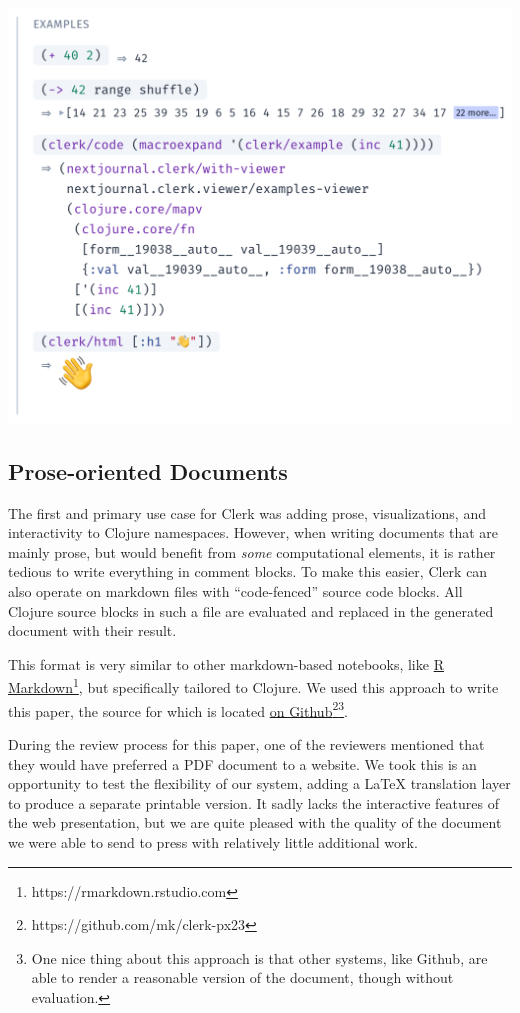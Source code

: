 \documentclass[sigconf,screen]{acmart}
\begin{document}
\includegraphics{images/anon-expr-5dtPQwixfSw57U4Tdiwqwrsj2tVHu1-result.png}

\hypertarget{prose-oriented-documents}{%
\subsection{Prose-oriented Documents}\label{prose-oriented-documents}}

The first and primary use case for Clerk was adding prose, visualizations, and interactivity to Clojure namespaces. However, when writing documents that are mainly prose, but would benefit from \emph{some} computational elements, it is rather tedious to write everything in comment blocks. To make this easier, Clerk can also operate on markdown files with ``code-fenced'' source code blocks. All Clojure source blocks in such a file are evaluated and replaced in the generated document with their result.

This format is very similar to other markdown-based notebooks, like {\href{https://rmarkdown.rstudio.com}{R Markdown}\footnote{https://rmarkdown.rstudio.com}}, but specifically tailored to Clojure. We used this approach to write this paper, the source for which is located {\href{https://github.com/mk/clerk-px23}{on Github}\footnote{https://github.com/mk/clerk-px23}}\footnote{One nice thing about this approach is that other systems, like Github, are able to render a reasonable version of the document, though without evaluation.}.

During the review process for this paper, one of the reviewers mentioned that they would have preferred a PDF document to a website. We took this is an opportunity to test the flexibility of our system, adding a LaTeX translation layer to produce a separate printable version. It sadly lacks the interactive features of the web presentation, but we are quite pleased with the quality of the document we were able to send to press with relatively little additional work.
\end{document}
